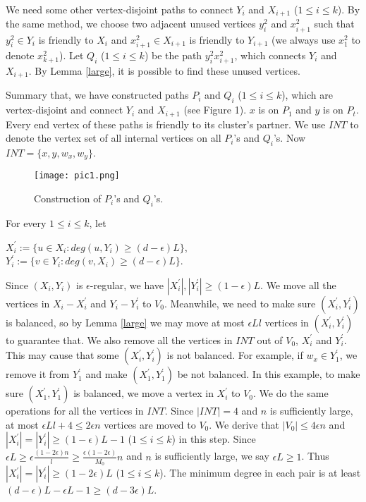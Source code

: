 \documentclass[11pt]{article}
\begin{document}
We need some other vertex-disjoint paths to connect $Y_i$ and $X_{i+1}$ ($1\leq i\leq k$). By the same method, we choose two adjacent unused vertices $y_i^2$ and $x_{i+1}^2$ such that $y_i^2\in Y_i$ is friendly to $X_i$ and $x_{i+1}^2\in X_{i+1}$ is friendly to $Y_{i+1}$ (we always use $x_1^2$ to denote $x_{k+1}^2$). Let $Q_i$ ($1\leq i\leq k$) be the path $y_i^2x_{i+1}^2$, which connects $Y_i$ and $X_{i+1}$. By Lemma \ref{large}, it is possible to find these unused vertices.

Summary that, we have constructed paths $P_i$ and $Q_i$ ($1\leq i\leq k$), which are vertex-disjoint and connect $Y_i$ and $X_{i+1}$ (see Figure 1). $x$ is on $P_1$ and $y$ is on $P_t$. Every end vertex of these paths is friendly to its cluster's partner. We use $INT$ to denote the vertex set of all internal vertices on all $P_i$'s and $Q_i$'s. Now $INT=\{x,y,w_x,w_y\}$.

\begin{figure}[htbp]
\centering
\texttt{[image: pic1.png]}
\caption{Construction of $P_i$'s and $Q_i$'s.}
\end{figure}


For every $1\leq i\leq k$, let

$X_i^{'}:=\{u\in X_i: deg(u,Y_i)\geq (d-\epsilon )L\}$, $Y_i^{'}:=\{v\in Y_i: deg(v,X_i)\geq (d-\epsilon )L\}$.

Since $(X_i,Y_i)$ is $\epsilon $-regular, we have $|X_i^{'}|, |Y_i^{'}|\geq (1-\epsilon )L$. We move all the vertices in $X_i-X_i^{'}$ and $Y_i-Y_i^{'}$ to $V_0$. Meanwhile, we need to make sure $(X_i^{'},Y_i^{'})$ is balanced, so by Lemma \ref{large} we may move at most $\epsilon Ll$ vertices in $(X_i^{'},Y_i^{'})$ to guarantee that. We also remove all the vertices in $INT$ out of $V_0$, $X_i^{'}$ and $Y_i^{'}$. This may cause that some $(X_i^{'},Y_i^{'})$ is not balanced. For example, if $w_x\in Y_1^{'}$, we remove it from $Y_1^{'}$ and make $(X_1^{'},Y_1^{'})$ be not balanced. In this example, to make sure $(X_1^{'},Y_1^{'})$ is balanced, we move a vertex in $X_i^{'}$ to $V_0$. We do the same operations for all the vertices in $INT$. Since $|INT|=4$ and $n$ is sufficiently large, at most $\epsilon Ll+4\leq 2\epsilon n$ vertices are moved to $V_0$. We derive that $|V_0|\leq 4\epsilon n$ and $|X_i^{'}|=|Y_i^{'}|\geq (1-\epsilon )L-1$ ($1\leq i\leq k$) in this step. Since $\epsilon L\geq \epsilon \frac{(1-2\epsilon)n}{l}\geq \frac{\epsilon (1-2\epsilon )}{M_0}n$ and $n$ is sufficiently large, we say $\epsilon L\geq 1$. Thus $|X_i^{'}|=|Y_i^{'}|\geq (1-2\epsilon )L$ ($1\leq i\leq k$). The minimum degree in each pair is at least $(d-\epsilon )L-\epsilon L-1\geq (d-3\epsilon )L$.
\end{document}
